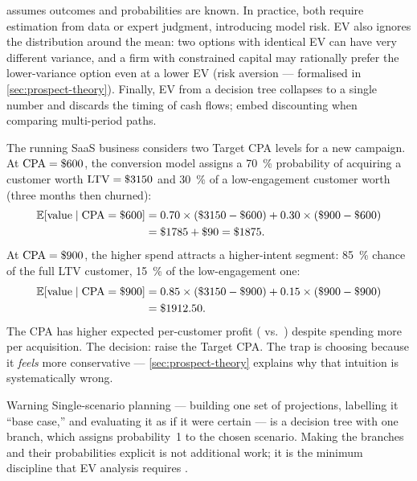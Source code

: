  assumes outcomes and probabilities are known. In practice, both require estimation
from data or expert judgment, introducing model risk. EV also ignores the distribution around the
mean: two options with identical EV can have very different variance, and a firm with constrained
capital may rationally prefer the lower-variance option even at a lower EV (risk aversion ---
formalised in \cref{sec:prospect-theory}). Finally, EV from a decision tree collapses to a single
number and discards the timing of cash flows; embed discounting when comparing multi-period paths.

\begin{example}
The running SaaS business considers two Target CPA levels for a new campaign. At
\(\mathrm{CPA}=\$\num{600}\), the conversion model assigns a \qty{70}{\percent} probability of
acquiring a customer worth \(\mathrm{LTV}=\$\num{3150}\) and \qty{30}{\percent} of a
low-engagement customer worth  (three months then churned):
\[
  \begin{aligned}
    \mathbb{E}[\text{value} \mid \mathrm{CPA}=\$\num{600}]
      &= 0.70\times(\$\num{3150}-\$\num{600}) + 0.30\times(\$\num{900}-\$\num{600}) \\
      &= \$\num{1785} + \$\num{90} = \$\num{1875}.
  \end{aligned}
\]
At \(\mathrm{CPA}=\$\num{900}\), the higher spend attracts a higher-intent segment:
\qty{85}{\percent} chance of the full LTV customer, \qty{15}{\percent} of the low-engagement one:
\[
  \begin{aligned}
    \mathbb{E}[\text{value} \mid \mathrm{CPA}=\$\num{900}]
      &= 0.85\times(\$\num{3150}-\$\num{900}) + 0.15\times(\$\num{900}-\$\num{900}) \\
      &= \$\num{1912.50}.
  \end{aligned}
\]
The  CPA has higher expected per-customer profit ( vs.\ )
despite spending  more per acquisition. The decision: raise the Target CPA. The trap
is choosing  because it \emph{feels} more conservative --- \cref{sec:prospect-theory}
explains why that intuition is systematically wrong.
\end{example}

\begin{admonition}{Warning}
Single-scenario planning --- building one set of projections, labelling it ``base case,'' and
evaluating it as if it were certain --- is a decision tree with one branch, which assigns
probability~1 to the chosen scenario. Making the branches and their probabilities explicit is not
additional work; it is the minimum discipline that EV analysis requires \parencite{kahneman2011}.
\end{admonition}

